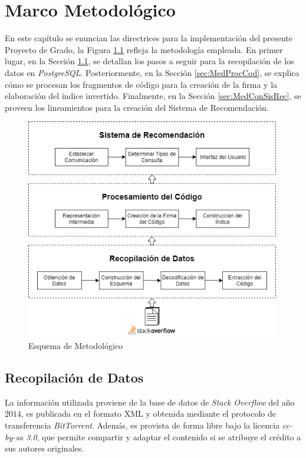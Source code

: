 \chapter{Marco Metodológico}

En este capítulo se enuncian las directrices para la implementación
del presente Proyecto de Grado, la Figura \ref{fig:metodo} refleja la metodología empleada.
En primer lugar, en la Sección \ref{sec:MedRecDat},
se detallan los pasos a seguir para la recopilación de los datos en \textit{PostgreSQL}.
Posteriormente, en la Sección \ref{sec:MedProcCod}, se explica cómo se procesan los fragmentos 
de código para la creación de la firma y la elaboración del índice invertido. 
Finalmente, en la Sección \ref{sec:MedConSisRec}, se proveen los lineamientos para la
creación del Sistema de Recomendación.

\begin{figure}[h]
\centering
\includegraphics[width=30em]{img/metodo.png}
\caption{Esquema de Metodológico}
\label{fig:metodo}
\end{figure}

\section{Recopilación de Datos}
\label{sec:MedRecDat}

La información utilizada proviene de la base de
datos de \textit{Stack Overflow} del año $2014$,
es publicada en el formato \ac{XML} y
obtenida mediante el protocolo de transferencia \textit{BitTorrent}.
Además, es provista de forma libre bajo la licencia \textit{cc-by-sa 3.0},
que permite compartir y adaptar el contenido
si se atribuye el crédito a sus autores originales.

